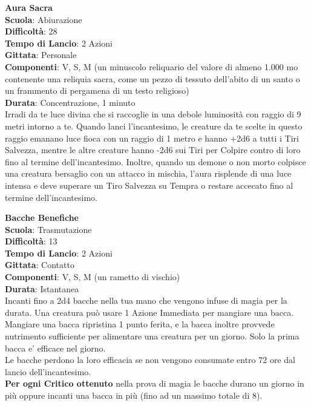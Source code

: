 \begin{multicols}{2}
\medskip\textbf{Aura Sacra}\\
\textbf{Scuola}: Abiurazione\\
\textbf{Difficoltà}: 28\\
\textbf{Tempo di Lancio}: 2 Azioni\\
\textbf{Gittata}: Personale\\
\textbf{Componenti}: V, S, M (un minuscolo reliquario del valore di almeno 1.000 mo contenente una reliquia sacra, come un pezzo di tessuto dell'abito di un santo o un frammento di pergamena di un testo religioso)\\
\textbf{Durata}: Concentrazione, 1 minuto\\
Irradi da te luce divina che si raccoglie in una debole luminosità con raggio di 9 metri intorno a te. Quando lanci l'incantesimo, le creature da te scelte in questo raggio emanano luce fioca con un raggio di 1 metro e hanno {+2d6} a tutti i Tiri Salvezza, mentre le altre creature hanno {-2d6} sui Tiri per Colpire contro di loro fino al termine dell'incantesimo. Inoltre, quando un demone o non morto colpisce una creatura bersaglio con un attacco in mischia, l'aura risplende di una luce intensa e deve superare un Tiro Salvezza su Tempra o restare accecato fino al termine dell'incantesimo.

\medskip\textbf{Bacche Benefiche}\\
\textbf{Scuola}: Trasmutazione\\
\textbf{Difficoltà}: 13\\
\textbf{Tempo di Lancio}: 2 Azioni\\
\textbf{Gittata}: Contatto\\
\textbf{Componenti}: V, S, M (un rametto di vischio)\\
\textbf{Durata}: Istantanea\\
Incanti fino a 2d4 bacche nella tua mano che vengono infuse di magia per la durata. Una creatura può usare 1 Azione Immediata per mangiare una bacca. Mangiare una bacca ripristina 1 punto ferita, e la bacca inoltre provvede nutrimento sufficiente per alimentare una creatura per un giorno. Solo la prima bacca e' efficace nel giorno.\\
Le bacche perdono la loro efficacia se non vengono consumate entro 72 ore dal lancio dell'incantesimo. \\
\textbf{Per ogni Critico ottenuto} nella prova di magia le bacche durano un giorno in più oppure incanti una bacca in più (fino ad un massimo totale di 8).


\end{multicols}
